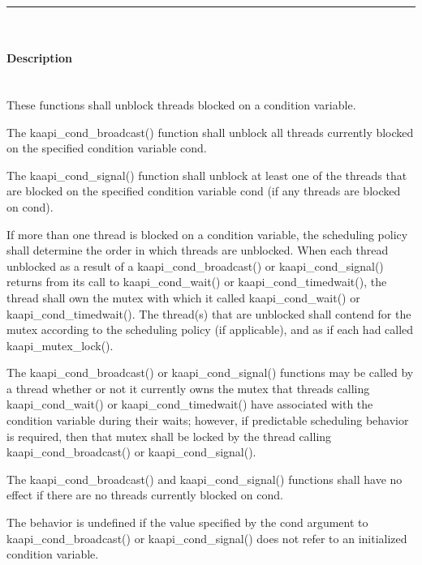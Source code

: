
\begin{description}
\vspace*{3ex} \hrule width 4cm
\vspace*{3ex} 
\item [\texttt{int kaapi\_cond\_broadcast(kaapi\_cond\_t *cond);}]
\item [\texttt{int kaapi\_cond\_signal(kaapi\_cond\_t *cond);}]~\\

\paragraph{Description}~\\
These functions shall unblock threads blocked on a condition variable.

The kaapi\_cond\_broadcast() function shall unblock all threads currently
blocked on the specified condition variable cond.

The kaapi\_cond\_signal() function shall unblock at least one of the threads
that are blocked on the specified condition variable cond (if any threads are
blocked on cond).

If more than one thread is blocked on a condition variable, the scheduling
policy shall determine the order in which threads are unblocked. When each
thread unblocked as a result of a kaapi\_cond\_broadcast() or
kaapi\_cond\_signal() returns from its call to kaapi\_cond\_wait() or
kaapi\_cond\_timedwait(), the thread shall own the mutex with which it called
kaapi\_cond\_wait() or kaapi\_cond\_timedwait(). The thread(s) that are
unblocked shall contend for the mutex according to the scheduling policy (if
applicable), and as if each had called kaapi\_mutex\_lock().

The kaapi\_cond\_broadcast() or kaapi\_cond\_signal() functions may be called
by a thread whether or not it currently owns the mutex that threads calling
kaapi\_cond\_wait() or kaapi\_cond\_timedwait() have associated with the
condition variable during their waits; however, if predictable scheduling
behavior is required, then that mutex shall be locked by the thread calling
kaapi\_cond\_broadcast() or kaapi\_cond\_signal().

The kaapi\_cond\_broadcast() and kaapi\_cond\_signal() functions shall have no
effect if there are no threads currently blocked on cond.

The behavior is undefined if the value specified by the cond argument to
kaapi\_cond\_broadcast() or kaapi\_cond\_signal() does not refer to an
initialized condition variable.


\end{description}
